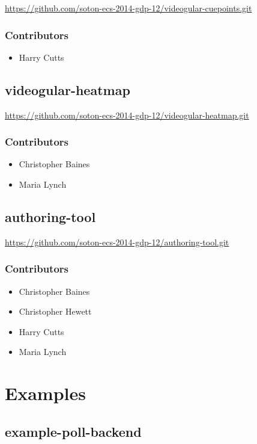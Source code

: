 \url{https://github.com/soton-ecs-2014-gdp-12/videogular-cuepoints.git}

\subsubsection{Contributors}
\begin{itemize}
  \item Harry Cutts
\end{itemize}

\subsection{videogular-heatmap}
\label{Section:Repo_videogular_heatmap}

\url{https://github.com/soton-ecs-2014-gdp-12/videogular-heatmap.git}

\subsubsection{Contributors}
\begin{itemize}
  \item Christopher Baines
  \item Maria Lynch
\end{itemize}

\subsection{authoring-tool}
\label{Section:Repo_authoring_tool}

\url{https://github.com/soton-ecs-2014-gdp-12/authoring-tool.git}

\subsubsection{Contributors}
\begin{itemize}
  \item Christopher Baines
  \item Christopher Hewett
  \item Harry Cutts
  \item Maria Lynch
\end{itemize}

\section{Examples}

\subsection{example-poll-backend}
\label{Section:Repo_example_poll_backend}

